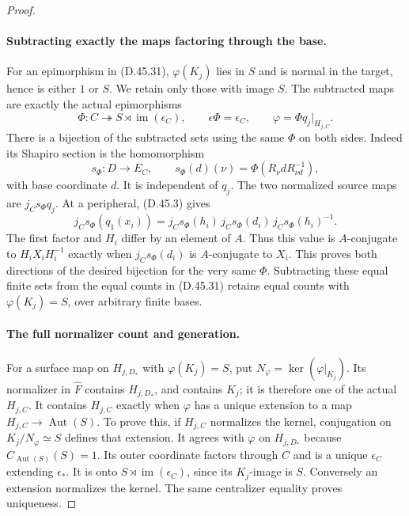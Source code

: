 \begin{proof}
\paragraph{Subtracting exactly the maps factoring through the base.}
For an epimorphism in \textup{(D.45.31)},
\(\varphi(K_j)\) lies in \(S\) and is normal in
the target, hence is either \(1\) or \(S\).
We retain only those with image \(S\).
The subtracted maps are exactly the actual
epimorphisms
\[
       \Phi:C\twoheadrightarrow
                  S\rtimes\operatorname{im}(\epsilon_C),
       \qquad \epsilon\Phi=\epsilon_C,
       \qquad \varphi=\Phi q_j|_{H_{j,C}}.
 \tag{D.45.32}
\]
There is a bijection of the subtracted sets
using the same \(\Phi\) on both sides.
Indeed its Shapiro section is the homomorphism
\[
 s_\Phi:D\longrightarrow E_C,\qquad
 s_\Phi(d)(\nu)=\Phi(R_\nu dR_{\nu d}^{-1}),
 \tag{D.45.33}
\]
with base coordinate \(d\).
It is independent of \(q_j\).
The two normalized source maps are
\(j_Cs_\Phi q_j\).
At a peripheral, \textup{(D.45.3)} gives
\[
 j_Cs_\Phi(q_1(x_i))
   =j_Cs_\Phi(h_i)\,
             j_Cs_\Phi(d_i)\,
                         j_Cs_\Phi(h_i)^{-1}.
 \tag{D.45.34}
\]
The first factor and \(H_i\) differ by an element
of \(A\).
Thus this value is \(A\)-conjugate to
\(H_iX_iH_i^{-1}\) exactly when
\(j_Cs_\Phi(d_i)\) is \(A\)-conjugate to \(X_i\).
This proves both directions of the desired
bijection for the very same \(\Phi\).
Subtracting these equal finite sets from the
equal counts in \textup{(D.45.31)} retains equal
counts with \(\varphi(K_j)=S\), over arbitrary
finite bases.

\paragraph{The full normalizer count and generation.}
For a surface map on \(H_{j,D_*}\) with
\(\varphi(K_j)=S\), put
\(N_\varphi=\ker(\varphi|_{K_j})\).
Its normalizer in \(\widehat F\) contains
\(H_{j,D_*}\), and contains \(K_j\); it is
therefore one of the actual \(H_{j,C}\).
It contains \(H_{j,C}\) exactly when \(\varphi\)
has a unique extension to a map
\(H_{j,C}\to\operatorname{Aut}(S)\).
To prove this, if \(H_{j,C}\) normalizes the
kernel, conjugation on \(K_j/N_\varphi\simeq S\)
defines that extension.
It agrees with \(\varphi\) on \(H_{j,D_*}\)
because \(C_{\operatorname{Aut}(S)}(S)=1\).
Its outer coordinate factors through \(C\)
and is a unique \(\epsilon_C\) extending
\(\epsilon_*\). It is onto
\(S\rtimes\operatorname{im}(\epsilon_C)\),
since its \(K_j\)-image is \(S\).
Conversely an extension normalizes the kernel.
The same centralizer equality proves uniqueness.


\end{proof}
